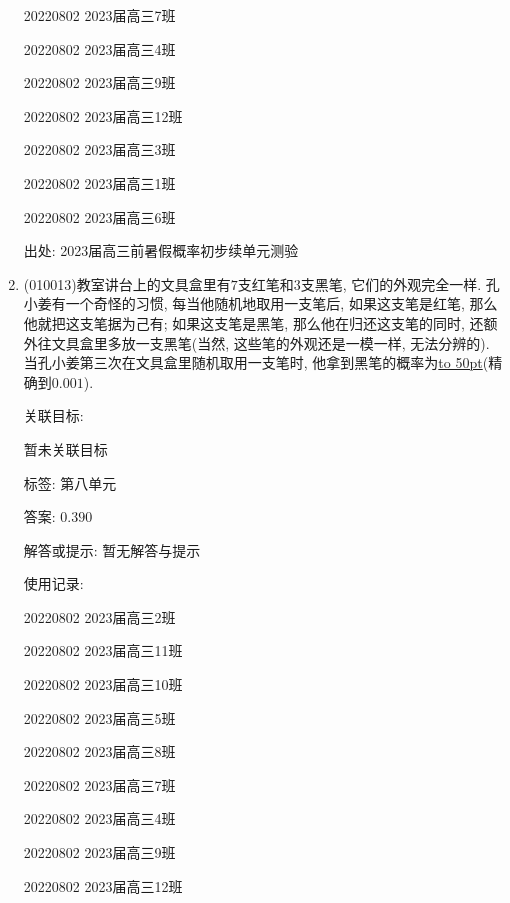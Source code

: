 \documentclass[10pt,a4paper]{article}
\newcommand{\blank}[1]{\underline{\hbox to #1pt{}}}
\begin{document}
\begin{enumerate}[1.]
20220802	2023届高三7班	

20220802	2023届高三4班	

20220802	2023届高三9班	

20220802	2023届高三12班	

20220802	2023届高三3班	

20220802	2023届高三1班	

20220802	2023届高三6班	


出处: 2023届高三前暑假概率初步续单元测验
\item { (010013)}教室讲台上的文具盒里有$7$支红笔和$3$支黑笔, 它们的外观完全一样. 孔小姜有一个奇怪的习惯, 每当他随机地取用一支笔后, 如果这支笔是红笔, 那么他就把这支笔据为己有; 如果这支笔是黑笔, 那么他在归还这支笔的同时, 还额外往文具盒里多放一支黑笔(当然, 这些笔的外观还是一模一样, 无法分辨的). 当孔小姜第三次在文具盒里随机取用一支笔时, 他拿到黑笔的概率为\blank{50}(精确到$0.001$).


关联目标:

暂未关联目标



标签: 第八单元

答案: $0.390$

解答或提示: 暂无解答与提示

使用记录:

20220802	2023届高三2班	

20220802	2023届高三11班	

20220802	2023届高三10班	

20220802	2023届高三5班	

20220802	2023届高三8班	

20220802	2023届高三7班	

20220802	2023届高三4班	

20220802	2023届高三9班	

20220802	2023届高三12班	


\end{enumerate}
\end{document}
